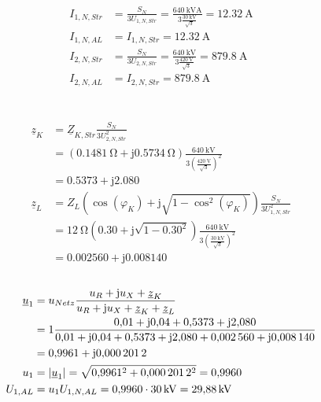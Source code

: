 \documentclass[11pt,a4paper]{scrartcl}
\DeclarePairedDelimiter{\abs}{\lvert}{\rvert}
\newcommand{\mybr}[1]{\left(#1\right)}
\renewcommand{\j}{\mathrm{j}}
\newcommand{\Z}{\underline{Z}}
\newcommand{\z}{\underline{z}}
\renewcommand{\u}{\underline{u}}
\newcommand{\0}{_{\mybr{0}}}
\newcommand{\1}{_{\mybr{1}}}
\newcommand{\2}{_{\mybr{2}}}
\newcommand{\UPA}{U_{1,AL}}
\newcommand{\UPNS}{U_{1,N,Str}}
\newcommand{\USNS}{U_{2,N,Str}}
\newcommand{\UPNA}{U_{1,N,AL}}
\newcommand{\IPNS}{I_{1,N,Str}}
\newcommand{\ISNS}{I_{2,N,Str}}
\newcommand{\IPNA}{I_{1,N,AL}}
\newcommand{\ISNA}{I_{2,N,AL}}
\begin{document}
\section{}
\begin{align}
\IPNS&=\frac{S_N}{3\UPNS}=\frac{\SI{640}{\kilo\volt\ampere}}{3\frac{\SI{30}{\kilo\volt}}{\sqrt{3}}}=\SI{12.32}{\ampere}\\
\IPNA&=\IPNS=\SI{12.32}{\ampere}\\
\ISNS&=\frac{S_N}{3\USNS}=\frac{\SI{640}{\kilo\volt}}{3\frac{\SI{420}{\volt}}{\sqrt{3}}}=\SI{879.8}{\ampere}\\
\ISNA&=\ISNS=\SI{879.8}{\ampere}
\end{align}

\section{}
\begin{align}
\z_K&=\Z_{K,Str}\frac{S_N}{3\USNS^2}\\
&=\mybr{\SI{0.1481}{\ohm}+\j\SI{0.5734}{\ohm}}\frac{\SI{640}{\kilo\volt}}{3\mybr{\frac{\SI{420}{\volt}}{\sqrt{3}}}^2}\\
&=\num{0.5373}+\j\num{2.080}\\
\z_L&=Z_L\mybr{\cos\mybr{\varphi_K}+\j\sqrt{1-\cos^2\mybr{\varphi_K}}}\frac{S_N}{3\UPNS^2}\\
&=\SI{12}{\ohm}\mybr{\num{0.30}+\j\sqrt{1-\num{0.30}^2}}\frac{\SI{640}{\kilo\volt}}{3\mybr{\frac{\SI{30}{\kilo\volt}}{\sqrt{3}}}^2}\\
&=\num{0.002560}+\j\num{0.008140}
\end{align}

\subsection{}
\begin{align}
\u_1&=u_{Netz}\frac{u_R+\j u_X+\z_K}{u_R+\j u_X+\z_K+\z_L}\\
&=1\frac{\num{0.01}+\j\num{0.04}+\num{0.5373}+\j\num{2.080}}{\num{0.01}+\j\num{0.04}+\num{0.5373}+\j\num{2.080}+\num{0.002560}+\j\num{0.008140}}\\
&=\num{0.9961}+\j\num{0.0002012}\\
u_1&=\abs{\u_1}=\sqrt{\num{0.9961}^2+\num{0.0002012}^2}=\num{0.9960}\\
\UPA&=u_1\UPNA=\num{0.9960}\cdot\SI{30}{\kilo\volt}=\SI{29.88}{\kilo\volt}
\end{align}
\end{document}

